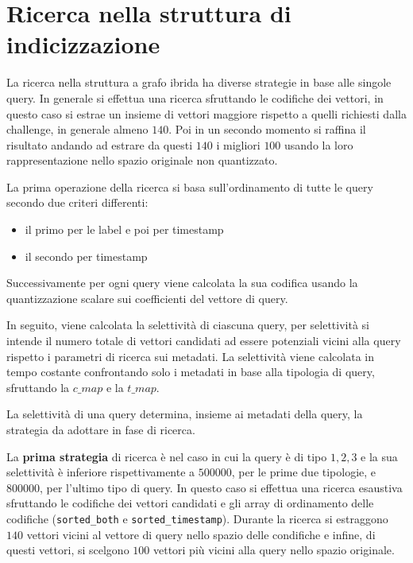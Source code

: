 \section{Ricerca nella struttura di indicizzazione}

La ricerca nella struttura a grafo ibrida ha diverse strategie in base alle singole 
query. In generale si effettua una ricerca sfruttando le codifiche dei vettori, 
in questo caso si estrae un insieme di vettori maggiore rispetto a quelli richiesti 
dalla challenge, in generale almeno $140$. Poi in un secondo momento si raffina 
il risultato andando ad estrare da questi $140$ i migliori $100$ usando la loro 
rappresentazione nello spazio originale non quantizzato. 

La prima operazione della ricerca si basa sull'ordinamento di tutte le query 
secondo due criteri differenti:
\begin{itemize}
    \item il primo per le label e poi per timestamp
    \item il secondo per timestamp
\end{itemize} 
Successivamente per ogni query viene calcolata la sua codifica usando la quantizzazione 
scalare sui coefficienti del vettore di query.

In seguito, viene calcolata la selettività di ciascuna query, per selettività
si intende il numero totale di vettori candidati ad essere potenziali vicini alla 
query rispetto i parametri di ricerca sui metadati. 
La selettività viene calcolata in tempo costante confrontando solo i metadati in 
base alla tipologia di query, sfruttando la $c\_map$ e la $t\_map$. 

La selettività di una query determina, insieme ai metadati della query, la strategia 
da adottare in fase di ricerca.

La \textbf{prima strategia} di ricerca è nel caso in cui la query è di tipo $1,2,3$ 
e la sua selettività è inferiore rispettivamente a $500000$, per le prime due tipologie, e $800000$, 
per l'ultimo tipo di query. In questo caso 
si effettua una ricerca esaustiva sfruttando le codifiche dei vettori candidati 
e gli array di ordinamento delle codifiche (\texttt{sorted\_both} e \texttt{sorted\_timestamp}).
Durante la ricerca si estraggono $140$ vettori vicini al vettore di query nello 
spazio delle condifiche e infine, di questi vettori, si scelgono $100$ vettori 
più vicini alla query nello spazio originale. 

